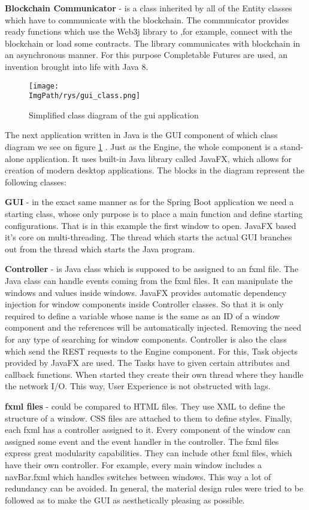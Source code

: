 \documentclass[a4paper,12pt,twoside,openany]{report}
\newcommand{\ImgPath}{.}
\begin{document}
\textbf{Blockchain Communicator} - is a class inherited by all of the Entity classes which have to communicate with the blockchain. The communicator provides ready functions which use the Web3j library to ,for example, connect with the blockchain or load some contracts. The library communicates with blockchain in an asynchronous manner. For this purpose Completable Futures are used, an invention brought into life with Java 8.

\begin{figure}[!htbp]
	\begin{center}
\centering
\texttt{[image: \\ImgPath/rys/gui\_class.png]}
\end{center}
	\caption{Simplified class diagram of the gui application}
	\label{gui class}
\end{figure}

The next application written in Java is the GUI component of which class diagram we see on figure \ref{gui class} . Just as the Engine, the whole component is a stand-alone application. It uses built-in Java library called JavaFX, which allows for creation of modern desktop applications. The blocks in the diagram represent the following classes:

\textbf{GUI} - in the exact same manner as for the Spring Boot application we need a starting class, whose only purpose is to place a main function and define starting configurations. That is in this example the first window to open. JavaFX based it's core on multi-threading. The thread which starts the actual GUI branches out from the thread which starts the Java program.

\textbf{Controller} - is Java class which is supposed to be assigned to an fxml file. The Java class can handle events coming from the fxml files. It can manipulate the windows and values inside windows. JavaFX provides automatic dependency injection for window components inside Controller classes. So that it is only required to define a variable whose name is the same as an ID of a window component and the references will be automatically injected. Removing the need for any type of searching for window components. Controller is also the class which send the REST requests to the Engine component. For this, Task objects provided by JavaFX are used. The Tasks have to given certain attributes and callback functions. When started they create their own thread where they handle the network I/O. This way, User Experience is not obstructed with lags.

\textbf{fxml files} - could be compared to HTML files. They use XML to define the structure of a window. CSS files are attached to them to define styles. Finally, each fxml has a controller assigned to it. Every component of the window can assigned some event and the event handler in the controller. The fxml files express great modularity capabilities. They can include other fxml files, which have their own controller. For example, every main window includes a navBar.fxml which handles switches between windows. This way a lot of redundancy can be avoided. In general, the material design rules were tried to be followed as to make the GUI as aesthetically pleasing as possible.
\end{document}
